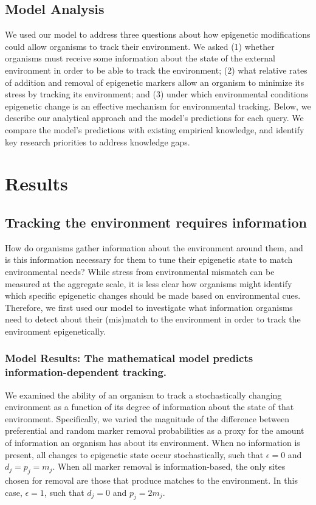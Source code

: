 \documentclass{article}
\begin{document}
\subsection{Model Analysis}
We used our model to address three questions about how epigenetic modifications could allow organisms to track their environment. We asked (1) whether organisms must receive some information about the state of the external environment in order to be able to track the environment; (2) what relative rates of addition and removal of epigenetic markers allow an organism to minimize its stress by tracking its environment; and (3) under which environmental conditions epigenetic change is an effective mechanism for environmental tracking. Below, we describe our analytical approach and the model's predictions for each query. We compare the model's predictions with existing empirical knowledge, and identify key research priorities to address knowledge gaps.





\clearpage

\section{Results}

\subsection{Tracking the environment requires information}
How do organisms gather information about the environment around them, and is this information necessary for them to tune their epigenetic state to match environmental needs? While stress from environmental mismatch can be measured at the aggregate scale, it is less clear how organisms might identify which specific epigenetic changes should be made based on environmental cues. Therefore, we first used our model to investigate what information organisms need to detect about their (mis)match to the environment in order to track the environment epigenetically.



\subsubsection{Model Results: The mathematical model predicts information-dependent tracking.}
We examined the ability of an organism to track a stochastically changing environment as a function of its degree of information about the state of that environment. Specifically, we varied the magnitude of the difference between preferential and random marker removal probabilities as a proxy for the amount of information an organism has about its environment. When no information is present, all changes to epigenetic state occur stochastically, such that $\epsilon = 0$ and $d_j = p_j = m_j$. When all marker removal is information-based, the only sites chosen for removal are those that produce matches to the environment. In this case, $\epsilon = 1$, such that $d_j = 0$ and $p_j = 2m_j$. 
\end{document}
